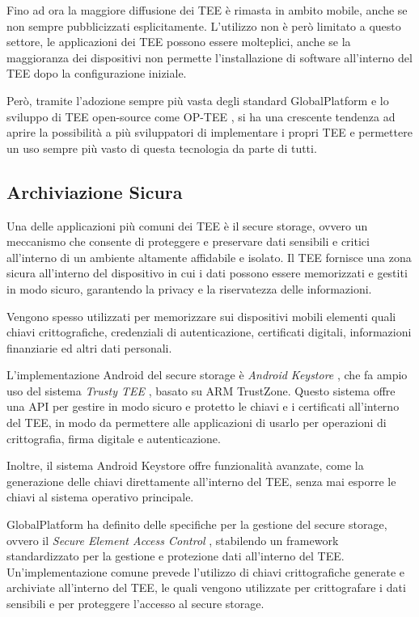 \documentclass[12pt,italian]{report}
\begin{document}
	Fino ad ora la maggiore diffusione dei TEE è rimasta in ambito mobile, anche se non sempre pubblicizzati esplicitamente. L'utilizzo non è però limitato a questo settore, le applicazioni dei TEE possono essere molteplici, anche se la maggioranza dei dispositivi non permette l'installazione di software all'interno del TEE dopo la configurazione iniziale.
	
	\bigbreak
	
	Però, tramite l'adozione sempre più vasta degli standard GlobalPlatform e lo sviluppo di TEE open-source come OP-TEE \cite{optee}, si ha una crescente tendenza ad aprire la possibilità a più sviluppatori di implementare i propri TEE e permettere un uso sempre più vasto di questa tecnologia da parte di tutti.
	
	
	\subsection{Archiviazione Sicura}
	\label{subsec:secure-storage}
	Una delle applicazioni più comuni dei TEE è il secure storage, ovvero un meccanismo che consente di proteggere e preservare dati sensibili e critici all'interno di un ambiente altamente affidabile e isolato. Il TEE fornisce una zona sicura all'interno del dispositivo in cui i dati possono essere memorizzati e gestiti in modo sicuro, garantendo la privacy e la riservatezza delle informazioni.
	
	Vengono spesso utilizzati per memorizzare sui dispositivi mobili elementi quali chiavi crittografiche, credenziali di autenticazione, certificati digitali, informazioni finanziarie ed altri dati personali.
	
	\bigbreak
	
	L'implementazione Android del secure storage è \textit{Android Keystore} \cite{androidkeystore}, che fa ampio uso del sistema \textit{Trusty TEE} \cite{androidtrustytee}, basato su ARM TrustZone. Questo sistema offre una API per gestire in modo sicuro e protetto le chiavi e i certificati all'interno del TEE, in modo da permettere alle applicazioni di usarlo per operazioni di crittografia, firma digitale e autenticazione.
	
	Inoltre, il sistema Android Keystore offre funzionalità avanzate, come la generazione delle chiavi direttamente all'interno del TEE, senza mai esporre le chiavi al sistema operativo principale. 
	
	\bigbreak
	
	GlobalPlatform ha definito delle specifiche per la gestione del secure storage, ovvero il \textit{Secure Element Access Control} \cite{gp2020seac}, stabilendo un framework standardizzato per la gestione e protezione dati all'interno del TEE. Un'implementazione comune prevede l'utilizzo di chiavi crittografiche generate e archiviate all'interno del TEE, le quali vengono utilizzate per crittografare i dati sensibili e per proteggere l'accesso al secure storage.
	
\end{document}
